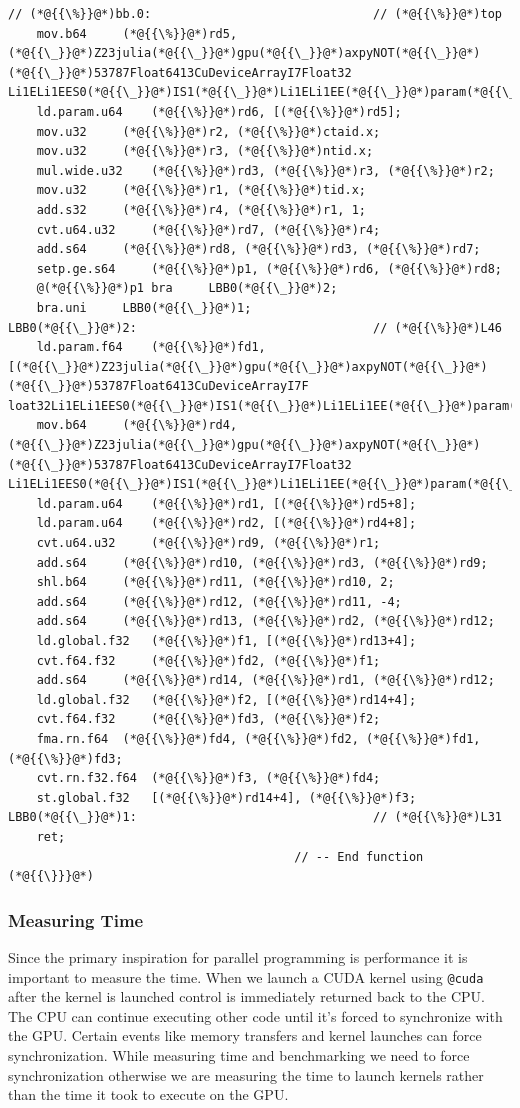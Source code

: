 \documentclass[12pt,a4paper]{article}
\begin{document}
\begin{lstlisting}
// (*@{{\%}}@*)bb.0:                               // (*@{{\%}}@*)top
	mov.b64 	(*@{{\%}}@*)rd5, (*@{{\_}}@*)Z23julia(*@{{\_}}@*)gpu(*@{{\_}}@*)axpyNOT(*@{{\_}}@*)(*@{{\_}}@*)53787Float6413CuDeviceArrayI7Float32
Li1ELi1EES0(*@{{\_}}@*)IS1(*@{{\_}}@*)Li1ELi1EE(*@{{\_}}@*)param(*@{{\_}}@*)2;
	ld.param.u64 	(*@{{\%}}@*)rd6, [(*@{{\%}}@*)rd5];
	mov.u32 	(*@{{\%}}@*)r2, (*@{{\%}}@*)ctaid.x;
	mov.u32 	(*@{{\%}}@*)r3, (*@{{\%}}@*)ntid.x;
	mul.wide.u32 	(*@{{\%}}@*)rd3, (*@{{\%}}@*)r3, (*@{{\%}}@*)r2;
	mov.u32 	(*@{{\%}}@*)r1, (*@{{\%}}@*)tid.x;
	add.s32 	(*@{{\%}}@*)r4, (*@{{\%}}@*)r1, 1;
	cvt.u64.u32 	(*@{{\%}}@*)rd7, (*@{{\%}}@*)r4;
	add.s64 	(*@{{\%}}@*)rd8, (*@{{\%}}@*)rd3, (*@{{\%}}@*)rd7;
	setp.ge.s64 	(*@{{\%}}@*)p1, (*@{{\%}}@*)rd6, (*@{{\%}}@*)rd8;
	@(*@{{\%}}@*)p1 bra 	LBB0(*@{{\_}}@*)2;
	bra.uni 	LBB0(*@{{\_}}@*)1;
LBB0(*@{{\_}}@*)2:                                 // (*@{{\%}}@*)L46
	ld.param.f64 	(*@{{\%}}@*)fd1, [(*@{{\_}}@*)Z23julia(*@{{\_}}@*)gpu(*@{{\_}}@*)axpyNOT(*@{{\_}}@*)(*@{{\_}}@*)53787Float6413CuDeviceArrayI7F
loat32Li1ELi1EES0(*@{{\_}}@*)IS1(*@{{\_}}@*)Li1ELi1EE(*@{{\_}}@*)param(*@{{\_}}@*)0];
	mov.b64 	(*@{{\%}}@*)rd4, (*@{{\_}}@*)Z23julia(*@{{\_}}@*)gpu(*@{{\_}}@*)axpyNOT(*@{{\_}}@*)(*@{{\_}}@*)53787Float6413CuDeviceArrayI7Float32
Li1ELi1EES0(*@{{\_}}@*)IS1(*@{{\_}}@*)Li1ELi1EE(*@{{\_}}@*)param(*@{{\_}}@*)1;
	ld.param.u64 	(*@{{\%}}@*)rd1, [(*@{{\%}}@*)rd5+8];
	ld.param.u64 	(*@{{\%}}@*)rd2, [(*@{{\%}}@*)rd4+8];
	cvt.u64.u32 	(*@{{\%}}@*)rd9, (*@{{\%}}@*)r1;
	add.s64 	(*@{{\%}}@*)rd10, (*@{{\%}}@*)rd3, (*@{{\%}}@*)rd9;
	shl.b64 	(*@{{\%}}@*)rd11, (*@{{\%}}@*)rd10, 2;
	add.s64 	(*@{{\%}}@*)rd12, (*@{{\%}}@*)rd11, -4;
	add.s64 	(*@{{\%}}@*)rd13, (*@{{\%}}@*)rd2, (*@{{\%}}@*)rd12;
	ld.global.f32 	(*@{{\%}}@*)f1, [(*@{{\%}}@*)rd13+4];
	cvt.f64.f32 	(*@{{\%}}@*)fd2, (*@{{\%}}@*)f1;
	add.s64 	(*@{{\%}}@*)rd14, (*@{{\%}}@*)rd1, (*@{{\%}}@*)rd12;
	ld.global.f32 	(*@{{\%}}@*)f2, [(*@{{\%}}@*)rd14+4];
	cvt.f64.f32 	(*@{{\%}}@*)fd3, (*@{{\%}}@*)f2;
	fma.rn.f64 	(*@{{\%}}@*)fd4, (*@{{\%}}@*)fd2, (*@{{\%}}@*)fd1, (*@{{\%}}@*)fd3;
	cvt.rn.f32.f64 	(*@{{\%}}@*)f3, (*@{{\%}}@*)fd4;
	st.global.f32 	[(*@{{\%}}@*)rd14+4], (*@{{\%}}@*)f3;
LBB0(*@{{\_}}@*)1:                                 // (*@{{\%}}@*)L31
	ret;
                                        // -- End function
(*@{{\}}}@*)
\end{lstlisting}


\subsubsection{Measuring Time}
Since the primary inspiration for parallel programming is performance it is important to measure the time. When we launch a CUDA kernel using \texttt{@cuda} after the kernel is launched control is immediately returned back to the CPU. The CPU can continue executing other code until it's forced to synchronize with the GPU. Certain events like memory transfers and kernel launches can force synchronization. While measuring time and benchmarking we need to force synchronization otherwise we are measuring the time to launch kernels rather than the time it took to execute on the GPU.
\end{document}
